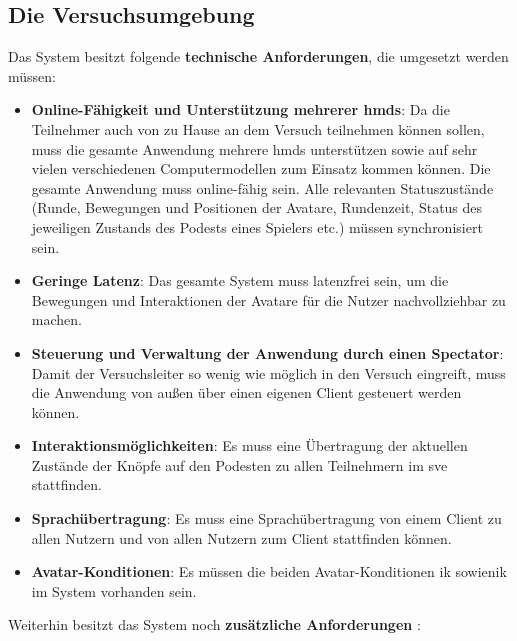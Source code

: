 \documentclass[a4paper,11pt]{article}%
\renewcommand{\\}{\vspace*{0.5\baselineskip} \newline}
\begin{document}
{	\subsection{Die Versuchsumgebung}
\label{TechnischeAnforderungen}
Das System besitzt folgende \textbf{technische Anforderungen}, die umgesetzt werden müssen:
\begin{itemize}
\item \textbf{Online-Fähigkeit und Unterstützung mehrerer \ac{hmd}s}: Da die Teilnehmer auch von zu Hause an dem Versuch teilnehmen können sollen, muss die gesamte Anwendung mehrere \ac{hmd}s unterstützen sowie auf sehr vielen verschiedenen Computermodellen zum Einsatz kommen können. Die gesamte Anwendung muss online-fähig sein. Alle relevanten Statuszustände (Runde, Bewegungen und Positionen der Avatare, Rundenzeit, Status des jeweiligen Zustands des Podests eines Spielers etc.) müssen synchronisiert sein.
\item \textbf{Geringe Latenz}: Das gesamte System muss latenzfrei sein, um die Bewegungen und Interaktionen der Avatare für die Nutzer nachvollziehbar zu machen.
\item \textbf{Steuerung und Verwaltung der Anwendung durch einen Spectator}: Damit der Versuchsleiter so wenig wie möglich in den Versuch eingreift, muss die Anwendung von außen über einen eigenen Client gesteuert werden können.
\item \textbf{Interaktionsmöglichkeiten}: Es muss eine Übertragung der aktuellen Zustände der Knöpfe auf den Podesten zu allen Teilnehmern im \ac{sve} stattfinden.
\item \textbf{Sprachübertragung}: Es muss eine Sprachübertragung von einem Client zu allen Nutzern und von allen Nutzern zum Client stattfinden können.
\item \textbf{Avatar-Konditionen}: Es müssen die beiden Avatar-Konditionen \ac{ik} sowie\newline \ac{nik} im System vorhanden sein.
\end{itemize}

Weiterhin besitzt das System noch \textbf{zusätzliche Anforderungen} :

}
\end{document}
